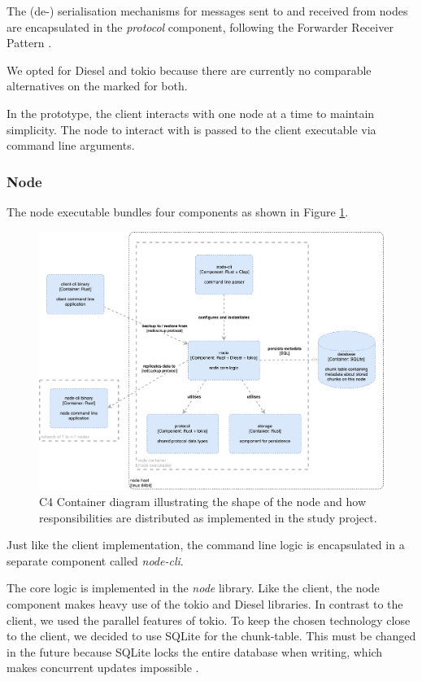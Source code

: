 The (de-) serialisation mechanisms for messages sent to and received from \glspl{node} are encapsulated in the \emph{protocol} component, following the Forwarder Receiver Pattern \cite{POSA1}.

We opted for Diesel and tokio because there are currently no comparable alternatives on the marked for both.

In the prototype, the \gls{client} interacts with one \gls{node} at a time to maintain simplicity. The \gls{node} to interact with is passed to the \gls{client} executable via command line arguments.

\subsubsection{Node}

The \gls{node} executable bundles four components as shown in Figure \ref{fig:c4-node-container}.  

\begin{figure}[h]
	\centering
	\includegraphics[width=1\linewidth]{resources/c4-node-container}
	\caption[Node specific C4 Container diagram]{C4 Container diagram illustrating the shape of the \gls{node} and how responsibilities are distributed as implemented in the study project.}
	\label{fig:c4-node-container}
\end{figure}

Just like the \gls{client} implementation, the command line logic is encapsulated in a separate component called \emph{node-cli}.

The core logic is implemented in the \emph{node} library. Like the \gls{client}, the \gls{node} component makes heavy use of the tokio and Diesel libraries. In contrast to the client, we used the parallel features of tokio. To keep the chosen technology close to the client, we decided to use SQLite for the \gls{chunk-table}. This must be changed in the future because SQLite locks the entire database when writing, which makes concurrent updates impossible \cite{sqlite-locking}.

